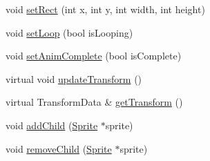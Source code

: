 \begin{DoxyCompactItemize}
\item 
void \mbox{\hyperlink{class_sprite_a47f0ac9f55ebdfa25d01fbc5c3a1b881}{set\+Rect}} (int x, int y, int width, int height)
\item 
void \mbox{\hyperlink{class_sprite_a1c19e2d3593015f3b605591a4e1bb04d}{set\+Loop}} (bool is\+Looping)
\item 
void \mbox{\hyperlink{class_sprite_a38f9be6d0bec1e1debf6221f97119b31}{set\+Anim\+Complete}} (bool is\+Complete)
\item 
virtual void \mbox{\hyperlink{class_sprite_aaa9e697dce4d8e28391735496c864867}{update\+Transform}} ()
\item 
virtual Transform\+Data \& \mbox{\hyperlink{class_sprite_a2270ad97c4ae71ff234676e322fe5409}{get\+Transform}} ()
\item 
void \mbox{\hyperlink{class_sprite_a62aef363da8c3a42e4eab4c3590b95a7}{add\+Child}} (\mbox{\hyperlink{class_sprite}{Sprite}} $\ast$sprite)
\item 
void \mbox{\hyperlink{class_sprite_a8c3e7df57403297e11bf8ea6672786ff}{remove\+Child}} (\mbox{\hyperlink{class_sprite}{Sprite}} $\ast$sprite)
\end{DoxyCompactItemize}
